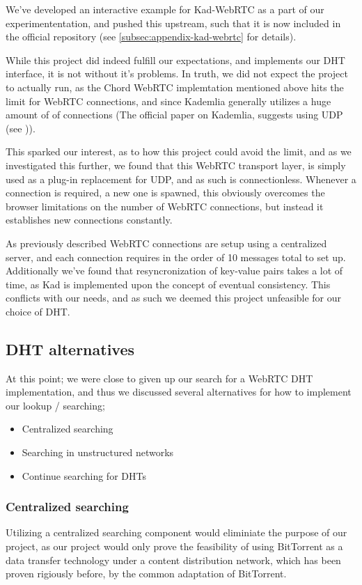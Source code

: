 We've developed an interactive example for Kad-WebRTC as a part of our
experimententation, and pushed this upstream, such that it is now included in 
the official repository (see \ref{subsec:appendix-kad-webrtc} for details).

While this project did indeed fulfill our expectations, and implements our \acs{DHT}
interface, it is not without it's problems. In truth, we did not expect the 
project to actually run, as the Chord WebRTC implemtation mentioned above hits
the limit for WebRTC connections, and since Kademlia generally utilizes a huge
amount of of connections (The official paper on Kademlia, suggests using \acs{UDP}
(see \citep{Maymounkov:Kademlia})).

This sparked our interest, as to how this project could avoid the limit, and as
we investigated this further, we found that this WebRTC transport layer, is
simply used as a plug-in replacement for \acs{UDP}, and as such is connectionless.
Whenever a connection is required, a new one is spawned, this obviously
overcomes the browser limitations on the number of WebRTC connections, but 
instead it establishes new connections constantly.

As previously described WebRTC connections are setup using a centralized server,
and each connection requires in the order of 10 messages total to set up.
Additionally we've found that resyncronization of key-value pairs takes a lot
of time, as Kad is implemented upon the concept of eventual consistency. This
conflicts with our needs, and as such we deemed this project unfeasible for
our choice of \acs{DHT}.

\subsection{\acs{DHT} alternatives}
At this point; we were close to given up our search for a WebRTC \acs{DHT}
implementation, and thus we discussed several alternatives for how to
implement our lookup / searching;
\begin{itemize}
\item Centralized searching
\item Searching in unstructured networks
\item Continue searching for \acs{DHT}s
\end{itemize}

\subsubsection{Centralized searching}
Utilizing a centralized searching component would eliminiate the purpose of our
project, as our project would only prove the feasibility of using BitTorrent as
a data transfer technology under a content distribution network, which has been
proven rigiously before, by the common adaptation of BitTorrent.

